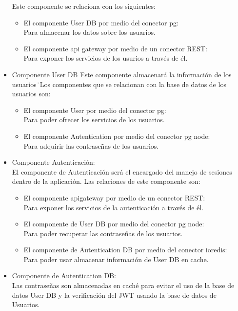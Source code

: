\begin{itemize}
    Este componente se relaciona con los siguientes:
    \begin{itemize}
        \item El componente User DB por medio del conector pg:\\
        Para almacenar los datos sobre los usuarios.
        \item El componente api \textunderscore gateway por medio de un conector REST:\\
        Para exponer los servicios de los usurios a través de él.
    \end{itemize}
    \item Componente User DB
    Este componente almacenará la información de los usuarios\.\
    Los componentes que se relacionan con la base de datos de los usuarios son:
    \begin{itemize}
        \item El componente User por medio del conector pg:\\
        Para poder ofrecer los servicios de los usuarios.
        \item El componente Autentication por medio del conector pg node:\\
        Para adquirir las contraseñas de los usuarios.
    \end{itemize}
    \item Componente Autenticación:\\
    El componente de Autenticación será el encargado del manejo de sesiones dentro de la aplicación.
    Las relaciones de este componente son:
    \begin{itemize}
        \item El componente api\textunderscore gateway por medio de un conector REST:\\
        Para exponer los servicios de la autenticación a través de él.
        \item El componente de User DB por medio del conector pg node:\\
        Para poder recuperar las contraseñas de los usuarios.
        \item El componente de Autentication DB por medio del conector ioredis:\\
        Para poder usar almacenar información de User DB en cache.
    \end{itemize}
    \item Componente de Autentication DB:\\
     Las contraseñas son almacenadas en caché para evitar el uso de la base de datos User DB y la verificación del JWT usando la base de datos de Usuarios.\\

\end{itemize}
